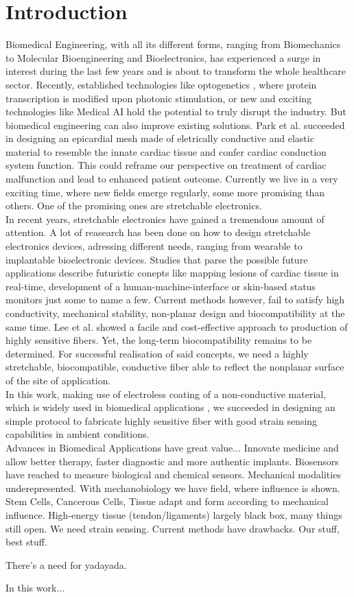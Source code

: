 \section{Introduction}
Biomedical Engineering, with all its different forms, ranging from Biomechanics to Molecular Bioengineering and Bioelectronics, has experienced a surge in interest during the last few years and is about to transform the whole healthcare sector. \cite{BiomedicalIndustry} Recently, established technologies like optogenetics \cite{Optogenetics}, where protein transcription is modified upon photonic stimulation, or new and exciting technologies like Medical AI \cite{MedicalAI} hold the potential to truly disrupt the industry. But biomedical engineering can also improve existing solutions. Park et al. \cite{EpicardialMesh} succeeded in designing an epicardial mesh made of eletrically conductive and elastic material to resemble the innate cardiac tissue and confer cardiac conduction system function. This could reframe our perspective on treatment of cardiac malfunction and lead to enhanced patient outcome. Currently we live in a very exciting time, where new fields emerge regularly, some more promising than others. One of the promising ones are stretchable electronics.\\
In recent years, stretchable electronics have gained a tremendous amount of attention. \cite{Cherenack, Lee} A lot of reasearch has been done on how to design stretchable electronics devices, adressing different needs, ranging from wearable to implantable bioelectronic devices. Studies that parse the possible future applications describe futuristic conepts like mapping lesions of cardiac tissue in real-time, development of a human-machine-interface or skin-based status monitors just some to name a few. \cite{Hochberg,Kim} Current methods however, fail to satisfy high conductivity, mechanical stability, non-planar design and biocompatibility at the same time. Lee et al. \cite{Lee} showed a facile and cost-effective approach to production of highly sensitive fibers. Yet, the long-term biocompatibility remains to be determined. For successful realisation of said concepts, we need a highly stretchable, biocompatible, conductive fiber able to reflect the nonplanar surface of the site of application.\\
In this work, making use of electroless coating of a non-conductive material, which is widely used in biomedical applications \cite{Pinchuk}, we succeeded in designing an simple protocol to fabricate  highly sensitive fiber with good strain sensing capabilities in ambient conditions.\\
Advances in Biomedical Applications have great value... Innovate medicine and allow better therapy, faster diagnostic and more authentic implants. Biosensors have reached to measure biological and chemical sensors. Mechanical modalities underepresented. With mechanobiology we have field, where influence is shown. Stem Cells, Cancerous Cells, Tissue adapt and form according to mechanical influence. High-energy tissue (tendon/ligaments) largely black box, many things still open. We need strain sensing. Current methods have drawbacks. Our stuff, best stuff. 

There's a need for yadayada.

In this work...